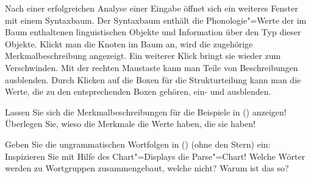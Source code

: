 \begin{enumerate}
      Nach einer erfolgreichen Analyse einer Eingabe öffnet sich ein weiteres Fenster mit einem
      Syntaxbaum. Der Syntaxbaum enthält die Phonologie"=Werte der im Baum enthaltenen
      linguistischen Objekte und Information über den Typ dieser Objekte.
      Klickt man die Knoten im Baum an, wird die zugehörige Merkmalbeschreibung
      angezeigt. Ein weiterer Klick bringt sie wieder zum Verschwinden. Mit der rechten Maustaste
      kann man Teile von Beschreibungen ausblenden. Durch Klicken auf die Boxen für die Strukturteilung
      kann man die Werte, die zu den entsprechenden Boxen gehören, ein- und ausblenden.

      Lassen Sie sich die Merkmalbeschreibungen für die Beispiele in () anzeigen!
      Überlegen Sie, wieso die Merkmale die Werte haben, die sie haben!
      
      Geben Sie die ungrammatischen Wortfolgen in () (ohne den Stern) ein:
      \eal
      \zl
      Inspizieren Sie mit Hilfe des Chart"=Displays die Parse"=Chart! Welche Wörter
      werden zu Wortgruppen zusammengebaut, welche nicht? Warum ist das so?
\end{enumerate}

